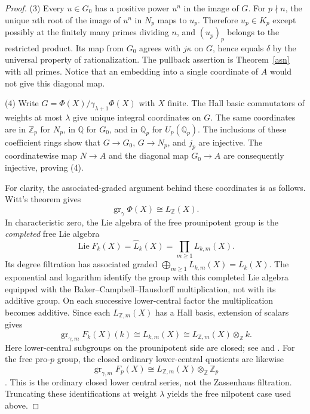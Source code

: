 \documentclass[11pt,a4paper]{article}
\begin{document}
\begin{proof}
(3) Every $u\in G_0$ has a positive power $u^n$ in the image of $G$.
For $p\nmid n$, the unique $n$th root of the image of $u^n$ in $N_p$
maps to $u_p$.  Therefore $u_p\in K_p$ except possibly at the finitely
many primes dividing $n$, and $(u_p)_p$ belongs to the restricted
product.  Its map from $G_0$ agrees with $j\kappa$ on $G$, hence equals
$\delta$ by the universal property of rationalization.  The pullback
assertion is Theorem~\ref{asn} with all primes.  Notice that an embedding
into a single coordinate of $A$ would not give this diagonal map.

(4) Write $G=\Phi(X)/\gamma_{\lambda+1}\Phi(X)$ with $X$ finite.
The Hall basic commutators of weights at most $\lambda$ give unique
integral coordinates on $G$.  The same coordinates are in $\mathbb Z_p$
for $N_p$, in $\mathbb Q$ for $G_0$, and in $\mathbb Q_p$ for
$U_p(\mathbb Q_p)$.  The inclusions of these coefficient rings show that
$G\to G_0$, $G\to N_p$, and $j_p$ are injective.  The coordinatewise
map $N\to A$ and the diagonal map $G_0\to A$ are consequently
injective, proving (4).

For clarity, the associated-graded argument behind these coordinates
is as follows.  Witt's theorem gives
\[
 \operatorname{gr}_{\gamma}\Phi(X)\cong L_{\mathbb Z}(X).
\]
In characteristic zero, the Lie algebra of the free prounipotent group
is the \emph{completed} free Lie algebra
\[
 \operatorname{Lie}F_k(X)=\widehat L_k(X)
 =\prod_{m\geq1}L_{k,m}(X).
\]
Its degree filtration has associated graded
$\bigoplus_{m\geq1}L_{k,m}(X)=L_k(X)$.  The exponential and logarithm
identify the group with this completed Lie algebra equipped with the
Baker--Campbell--Hausdorff multiplication, not with its additive group.
On each successive lower-central factor the multiplication becomes additive.
Since each $L_{\mathbb Z,m}(X)$ has a Hall basis, extension of scalars gives
\[
 \operatorname{gr}_{\gamma,m}F_k(X)(k)
 \cong L_{k,m}(X)
 \cong L_{\mathbb Z,m}(X)\otimes_{\mathbb Z}k.
\]
Here lower-central subgroups on the prounipotent side are closed;
see \cite[Chapter~IV, Sections~6--7]{Se} and
\cite[Appendix~A, Section~3]{Qui5}.
For the free pro-$p$ group, the closed ordinary lower-central quotients
are likewise
\[
 \operatorname{gr}_{\gamma,m}F_p(X)
 \cong L_{\mathbb Z,m}(X)\otimes_{\mathbb Z}\mathbb Z_p
\]
\cite[Propositions~3.2.2 and~3.2.5]{ZR}.  This is the ordinary closed
lower central series, not the Zassenhaus filtration.  Truncating these
identifications at weight $\lambda$ yields the free nilpotent case
used above.
\end{proof}
\end{document}
